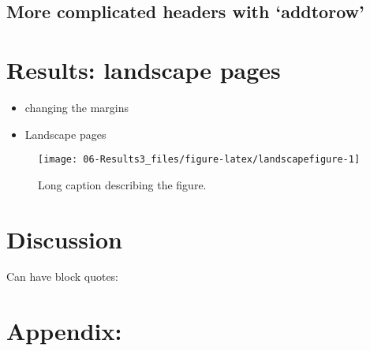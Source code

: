\documentclass[12pt,]{book}
\providecommand{\tightlist}{%
  \setlength{\itemsep}{0pt}\setlength{\parskip}{0pt}}
\begin{document}
\hypertarget{more-complicated-headers-with-addtorow}{%
\section{More complicated headers with `addtorow'}\label{more-complicated-headers-with-addtorow}}

\hypertarget{chapter6}{%
\chapter{Results: landscape pages}\label{chapter6}}

\begin{itemize}
\tightlist
\item
  changing the margins
\item
  Landscape pages
\end{itemize}

\pagebreak
\clearpage 
\begin{landscape}

\begin{figure}
\texttt{[image: 06-Results3\_files/figure-latex/landscapefigure-1]} \caption[Landscape figure: short caption for LoF]{Long caption describing the figure.}\label{fig:landscapefigure}
\end{figure}

\end{landscape}
\clearpage
\pagebreak
\restoregeometry

\hypertarget{discussion}{%
\chapter{Discussion}\label{discussion}}

Can have block quotes:

\begin{quote}
\blindtext
\end{quote}

\hypertarget{Appendix1}{%
\chapter{Appendix:}\label{Appendix1}}


\end{document}
